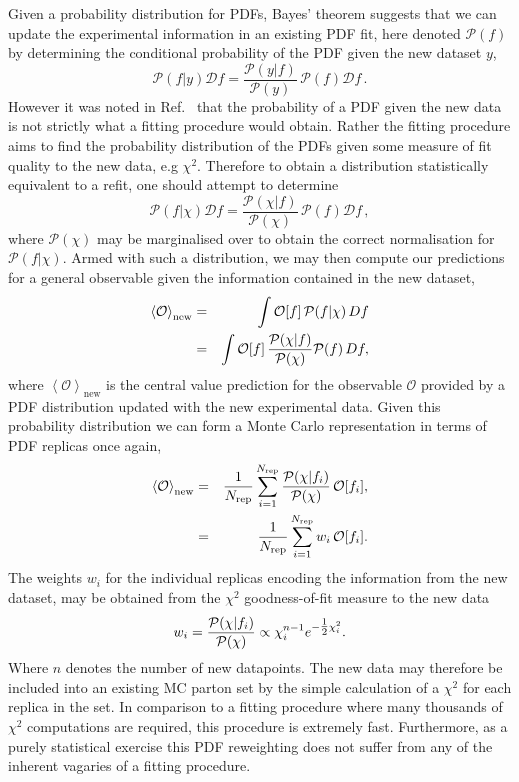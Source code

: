 Given a probability distribution for PDFs, Bayes' theorem suggests that we can update the experimental information in an existing PDF fit, here denoted $\mathcal{P}(f)$ by determining the conditional probability of the PDF given the new dataset ${y}$,  
\begin{equation}
  {\mathcal P}(f|y) \mathcal Df  =  \frac{{\mathcal P}(y|f)}{{\mathcal P}(y)} \, {\mathcal P}(f) \mathcal Df\, .   \label{eq:bayes2}
\end{equation}
However it was noted in Ref.~\cite{Ball:2010gb} that the probability of a PDF given the new data is not strictly what a fitting procedure would obtain. Rather the fitting procedure aims to find the probability distribution of the PDFs given some measure of fit quality to the new data, e.g $\chi^2$. Therefore to obtain a distribution statistically equivalent to a refit, one should attempt to determine
\begin{equation}
  \label{eq:bayes3}
  {\mathcal P}(f|\chi) \mathcal Df =  \frac{{\mathcal P}(\chi |f)}{{\mathcal P}(\chi)} \, {\mathcal P}(f) \mathcal Df\, ,
\end{equation}
where $\mathcal{P}(\chi)$ may be marginalised over to obtain the correct normalisation for ${\mathcal P}(f|\chi)$. Armed with such a distribution, we may then compute our predictions for a general observable given the information contained in the new dataset,
\begin{eqnarray}
\left<\mathcal{O}\right>_{\text{new}}&=&\int \mathcal{O}[f] \,
\mathcal{P}(f|\chi)\,Df\nonumber\\ &=&\int \mathcal{O}[f]
\,{{\mathcal{P}(\chi|f)}\over {\mathcal{P}(\chi)}}
\mathcal{P}(f)\,Df,\nonumber
\end{eqnarray}
where $\left<\mathcal{O}\right>_{\text{new}}$ is the central value prediction for the observable $\mathcal{O}$ provided by a PDF distribution updated with the new experimental data. Given this probability distribution we can form a Monte Carlo representation in terms of PDF replicas once again,
\begin{eqnarray} 
\left<\mathcal{O}\right>_{\text{new}}&=&{{1}\over {N_{\text{rep}}}}\sum_{i=1}^{N_{\text{rep}}}
{{\mathcal{P}(\chi|f_i)}\over {\mathcal{P}(\chi)}}\,\mathcal{O}[f_i], \nonumber \\
&=& {{1}\over {N_{\text{rep}}}}\sum_{i=1}^{N_{\text{rep}}} w_i\,\mathcal{O}[f_i]. 
\label{eq:avgnewx}
\end{eqnarray}
The weights $w_i$ for the individual replicas encoding the information from the new dataset, may be obtained from the $\chi^2$ goodness-of-fit measure to the new data
\begin{equation}
w_i = {{\mathcal{P}(\chi|f_i)}\over {\mathcal{P}(\chi)}} \propto \chi_i^{n-1} e^{-\hbox{${{1}\over {2}}$}\chi_i^2}.
\label{eq:weightscsq}
\end{equation}
Where $n$ denotes the number of new datapoints. The new data may therefore be included into an existing MC parton set by the simple calculation of a $\chi^2$ for each replica in the set. In comparison to a fitting procedure where many thousands of $\chi^2$ computations are required, this procedure is extremely fast. Furthermore, as a purely statistical exercise
this PDF reweighting does not suffer from any of the inherent vagaries of a fitting procedure.

